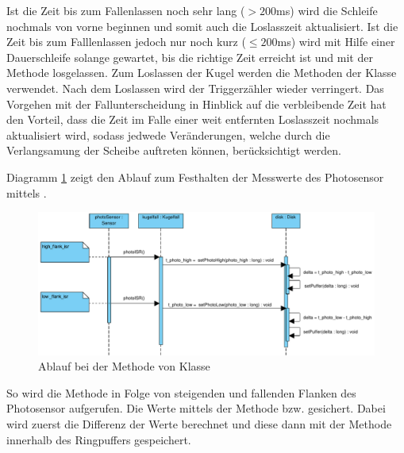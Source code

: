 Ist die Zeit bis zum Fallenlassen noch sehr lang ($>200$ms) wird die Schleife nochmals von vorne beginnen und somit auch die Loslasszeit aktualisiert.
Ist die Zeit bis zum Falllenlassen jedoch nur noch kurz ($\leq200$ms) wird mit Hilfe einer Dauerschleife solange gewartet, bis die richtige Zeit erreicht ist und mit der Methode  losgelassen.
Zum Loslassen der Kugel werden die Methoden der Klasse  verwendet.
Nach dem Loslassen wird der Triggerzähler wieder verringert.
Das Vorgehen mit der Fallunterscheidung in Hinblick auf die verbleibende Zeit hat den Vorteil, dass die Zeit im Falle einer weit entfernten Loslasszeit nochmals aktualisiert wird, sodass jedwede Veränderungen, welche durch die Verlangsamung der Scheibe auftreten können, berücksichtigt werden.

Diagramm \ref{fig:photoISR} zeigt den Ablauf zum Festhalten der Messwerte des Photosensor mittels . 
\begin{figure}[htbp]
	\centering
	\includegraphics[width=\textwidth]{abb/photoISR_cropped}
	\caption{Ablauf bei der Methode  von Klasse }
	\label{fig:photoISR}
\end{figure}
So wird die  Methode  in Folge von steigenden und fallenden Flanken des Photosensor aufgerufen.
Die Werte mittels der Methode  bzw.  gesichert.
Dabei wird zuerst die Differenz der Werte berechnet und diese dann mit der Methode  innerhalb des Ringpuffers gespeichert.


